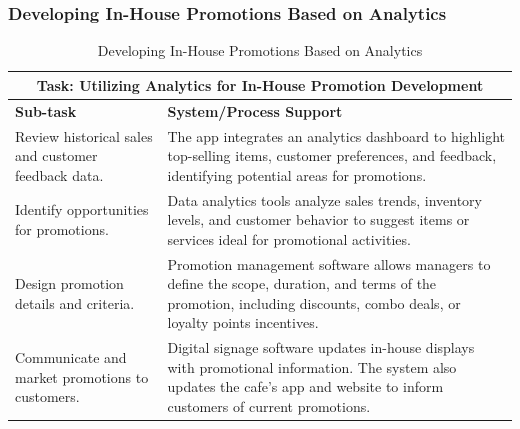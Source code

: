 \documentclass{article}
\begin{document}
\subsubsection{Developing In-House Promotions Based on Analytics}
\begin{table}[htbp]
\centering
\begin{tabular}{ |p{5cm}|p{10cm}|  }
\hline
\multicolumn{2}{|c|}{\textbf{Task: Utilizing Analytics for In-House Promotion Development}} \\
\hline
\textbf{Sub-task} & \textbf{System/Process Support}    \\
\hline
Review historical sales and customer feedback data. & The app integrates an analytics dashboard to highlight top-selling items, customer preferences, and feedback, identifying potential areas for promotions.   \\
\hline
Identify opportunities for promotions. & Data analytics tools analyze sales trends, inventory levels, and customer behavior to suggest items or services ideal for promotional activities.   \\
\hline
Design promotion details and criteria. & Promotion management software allows managers to define the scope, duration, and terms of the promotion, including discounts, combo deals, or loyalty points incentives.   \\
\hline
Communicate and market promotions to customers. & Digital signage software updates in-house displays with promotional information. The system also updates the cafe's app and website to inform customers of current promotions.   \\
\hline

\end{tabular}
\caption{Developing In-House Promotions Based on Analytics}
\label{tab:Developing In-House Promotions Based on Analytics}
\end{table}
\end{document}
